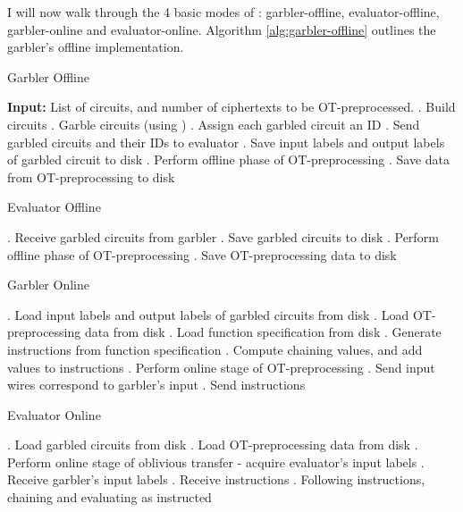 I will now walk through the 4 basic modes of \CompGC: garbler-offline, evaluator-offline, garbler-online and evaluator-online.
Algorithm \ref{alg:garbler-offline} outlines the garbler's offline implementation.

\begin{algorithm}
    \caption{Garbler Offline}
    \label{alg:garbler-offline}
    \begin{algorithmic}
        \State \textbf{Input:} List of circuits, and number of ciphertexts to be OT-preprocessed.
        . Build circuits
        . Garble circuits (using \LibGarble)
        . Assign each garbled circuit an ID
        . Send garbled circuits and their IDs to evaluator
        . Save input labels and output labels of garbled circuit to disk
        . Perform offline phase of OT-preprocessing
        . Save data from OT-preprocessing to disk
    \end{algorithmic}
\end{algorithm}

\begin{algorithm}
    \caption{Evaluator Offline}
    \label{alg:evaluator-offline}
    \begin{algorithmic}
        . Receive garbled circuits from garbler
        . Save garbled circuits to disk
        . Perform offline phase of OT-preprocessing
        . Save OT-preprocessing data to disk
    \end{algorithmic}
\end{algorithm}

\begin{algorithm}
    \caption{Garbler Online}
    \label{alg:evaluator-offline}
    \begin{algorithmic}
        . Load input labels and output labels of garbled circuits from disk
        . Load OT-preprocessing data from disk
        . Load function specification from disk
        . Generate instructions from function specification
        . Compute chaining values, and add values to instructions
        . Perform online stage of OT-preprocessing
        . Send input wires correspond to garbler's input
        . Send instructions
    \end{algorithmic}
\end{algorithm}

\begin{algorithm}
    \caption{Evaluator Online}
    \label{alg:evaluator-offline}
    \begin{algorithmic}
        . Load garbled circuits from disk
        . Load OT-preprocessing data from disk
        . Perform online stage of oblivious transfer - acquire evaluator's input labels
        . Receive garbler's input labels
        . Receive instructions
        . Following instructions, chaining and evaluating as instructed
    \end{algorithmic}
\end{algorithm}


